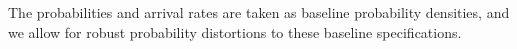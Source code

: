 \documentclass[12pt]{article}
\begin{document}
The probabilities and arrival rates are taken as baseline probability densities, and we allow for robust probability distortions to these baseline specifications. 









\end{document}

